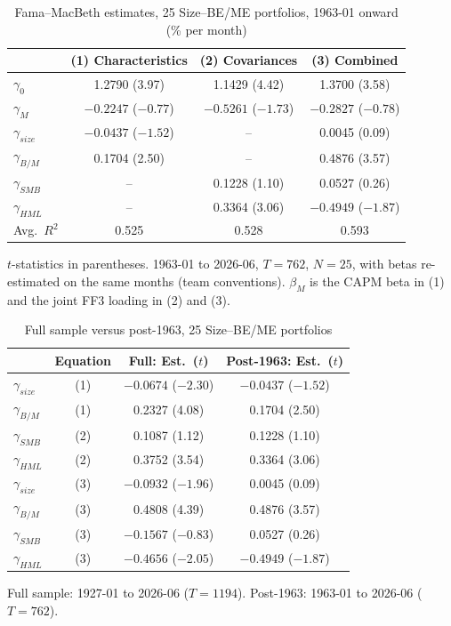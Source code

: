 \documentclass[11pt]{article}
\begin{document}
\begin{table}[H]\centering\small
\caption{Fama--MacBeth estimates, 25 Size--BE/ME portfolios, 1963-01 onward (\% per month)}
\begin{tabular}{lccc}
\toprule
 & (1) Characteristics & (2) Covariances & (3) Combined \\
\midrule
$\gamma_0$       & 1.2790 (3.97)       & 1.1429 (4.42)       & 1.3700 (3.58)       \\
$\gamma_M$       & $-0.2247$ ($-0.77$) & $-0.5261$ ($-1.73$) & $-0.2827$ ($-0.78$) \\
$\gamma_{size}$  & $-0.0437$ ($-1.52$) & --                  & 0.0045 (0.09)       \\
$\gamma_{B/M}$   & 0.1704 (2.50)       & --                  & 0.4876 (3.57)       \\
$\gamma_{SMB}$   & --                  & 0.1228 (1.10)       & 0.0527 (0.26)       \\
$\gamma_{HML}$   & --                  & 0.3364 (3.06)       & $-0.4949$ ($-1.87$) \\
\midrule
Avg.\ $R^2$      & 0.525               & 0.528               & 0.593               \\
\bottomrule
\end{tabular}
\par\smallskip\footnotesize $t$-statistics in parentheses. 1963-01 to 2026-06, $T = 762$,
$N = 25$, with betas re-estimated on the same months (team conventions). $\beta_M$ is the
CAPM beta in (1) and the joint FF3 loading in (2) and (3).
\end{table}

\begin{table}[H]\centering\small
\caption{Full sample versus post-1963, 25 Size--BE/ME portfolios}
\begin{tabular}{lccc}
\toprule
 & Equation & Full: Est.\ ($t$) & Post-1963: Est.\ ($t$) \\
\midrule
$\gamma_{size}$ & (1) & $-0.0674$ ($-2.30$) & $-0.0437$ ($-1.52$) \\
$\gamma_{B/M}$  & (1) & 0.2327 (4.08)       & 0.1704 (2.50)       \\
$\gamma_{SMB}$  & (2) & 0.1087 (1.12)       & 0.1228 (1.10)       \\
$\gamma_{HML}$  & (2) & 0.3752 (3.54)       & 0.3364 (3.06)       \\
$\gamma_{size}$ & (3) & $-0.0932$ ($-1.96$) & 0.0045 (0.09)       \\
$\gamma_{B/M}$  & (3) & 0.4808 (4.39)       & 0.4876 (3.57)       \\
$\gamma_{SMB}$  & (3) & $-0.1567$ ($-0.83$) & 0.0527 (0.26)       \\
$\gamma_{HML}$  & (3) & $-0.4656$ ($-2.05$) & $-0.4949$ ($-1.87$) \\
\bottomrule
\end{tabular}
\par\smallskip\footnotesize Full sample: 1927-01 to 2026-06 ($T = 1194$). Post-1963:
1963-01 to 2026-06 ($T = 762$).
\end{table}
\end{document}
